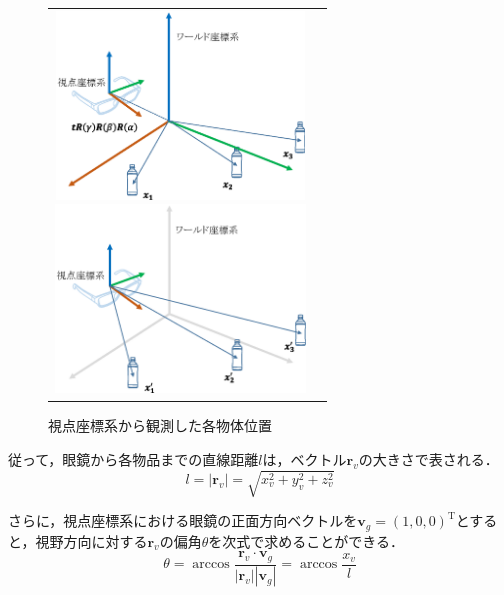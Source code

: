 \begin{figure}[htbp]
\begin{tabular}{cc}
%
  \begin{minipage}{0.5\textwidth}
    \begin{center}
      \includegraphics[height=50mm]{figure/world_coodinates.eps}
      \caption{ワールド座標系から観測した各物体位置}
      \label{fig:world_coodinates}
    \end{center}
  \end{minipage}
%
  \begin{minipage}{0.5\textwidth}
    \begin{center}
      \includegraphics[height=50mm]{figure/view_coodinates.eps}
      \caption{視点座標系から観測した各物体位置}
      \label{fig:view_coodinates}
    \end{center}
  \end{minipage}
%
\end{tabular}
\end{figure}

従って，眼鏡から各物品までの直線距離$ l $は，ベクトル$ \bm{r}_v $の大きさで表される．
%
\begin{equation}
{
  l = |\bm{r}_v| = \sqrt{x_v^2+y_v^2+z_v^2}
}
\end{equation}

さらに，視点座標系における眼鏡の正面方向ベクトルを$ \bm{v}_g = \left( 1, 0, 0 \right)^{\mathrm{T}} $とすると，視野方向に対する$ \bm{r}_v $の偏角$ \theta $を次式で求めることができる．
%
\begin{equation}
{
  \theta 
  = \arccos{\frac{\bm{r}_v \cdot \bm{v}_g}{|\bm{r}_v||\bm{v}_g|}}
  = \arccos{\frac{x_v}{l}}
}
\end{equation}
